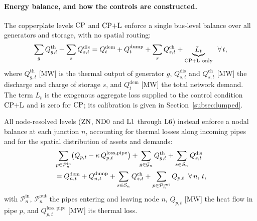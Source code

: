 \paragraph{Energy balance, and how the controls are constructed.}
The copperplate levels $\mathrm{CP}$ and $\mathrm{CP{+}L}$ enforce a single bus-level balance over all
generators and storage, with no spatial routing:
%
\begin{equation}
  \sum_{g} Q_{g,t}^{\mathrm{th}}
    + \sum_{s} Q_{s,t}^{\mathrm{dis}}
  = Q_t^{\mathrm{dem}} + Q_t^{\mathrm{dump}}
    + \sum_{s} Q_{s,t}^{\mathrm{ch}}
  + \underbrace{L_t}_{\mathrm{CP{+}L}\ \mathrm{only}}
  \;\; \forall\, t,
  \label{eq:balance_cp}
\end{equation}
%
where $Q_{g,t}^{\mathrm{th}}$ [MW] is the thermal output of generator $g$,
$Q_{s,t}^{\mathrm{dis}}$ and $Q_{s,t}^{\mathrm{ch}}$ [MW] the discharge and charge of
storage $s$, and $Q_t^{\mathrm{dem}}$ [MW] the total network demand. The term $L_t$ is
the exogenous aggregate loss supplied to the control condition $\mathrm{CP{+}L}$ and is zero for
$\mathrm{CP}$; its calibration is given in Section~\ref{subsec:lumped}.

All node-resolved levels ($\mathrm{ZN}$, $\mathrm{ND0}$ and $\mathrm{L1}$ through $\mathrm{L6}$) instead enforce
a nodal balance at each junction $n$, accounting for thermal losses along incoming pipes
and for the spatial distribution of assets and demands:
%
\begin{align}
  &\sum_{p \in \mathcal{P}_n^{\mathrm{in}}}
    \bigl(Q_{p,t} - \kappa\, Q_{p,t}^{\mathrm{loss,pipe}}\bigr)
  + \sum_{g \in \mathcal{G}_n} Q_{g,t}^{\mathrm{th}}
  + \sum_{s \in \mathcal{S}_n} Q_{s,t}^{\mathrm{dis}} \notag \\
  &= Q_{n,t}^{\mathrm{dem}} + Q_{n,t}^{\mathrm{dump}}
  + \sum_{s \in \mathcal{S}_n} Q_{s,t}^{\mathrm{ch}}
  + \sum_{p \in \mathcal{P}_n^{\mathrm{out}}} Q_{p,t}
  \;\; \forall\, n,\, t,
  \label{eq:balance_nodal}
\end{align}
%
with $\mathcal{P}_n^{\mathrm{in}}$, $\mathcal{P}_n^{\mathrm{out}}$ the pipes entering and
leaving node $n$, $Q_{p,t}$ [MW] the heat flow in pipe $p$, and
$Q_{p,t}^{\mathrm{loss,pipe}}$ [MW] its thermal loss.

